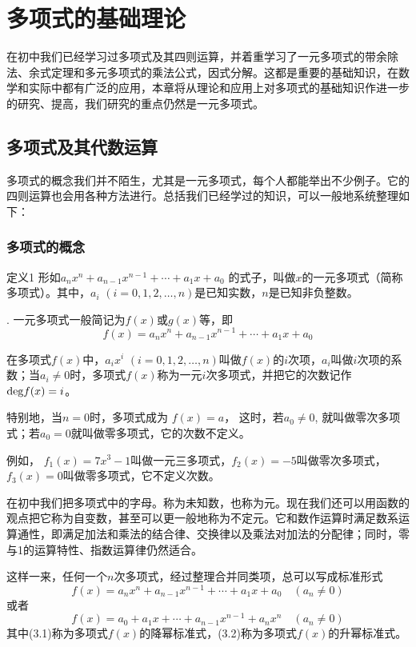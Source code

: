 \chapter{多项式的基础理论}
在初中我们已经学习过多项式及其四则运算，并着重学习了一元多项式的带余除法、余式定理和多元多项式的乘法公式，因式分解。这都是重要的基础知识，在数学和实际中都有广泛的应用，本章将从理论和应用上对多项式的基础知识作进一步的研究、提高，我们研究的重点仍然是一元多项式。

\section{多项式及其代数运算}
多项式的概念我们并不陌生，尤其是一元多项式，每个人都能举出不少例子。它的四则运算也会用各种方法进行。总括我们已经学过的知识，可以一般地系统整理如下：

\subsection{多项式的概念}
\begin{blk}{定义1}
    形如$a_nx^n+a_{n-1}x^{n-1}+\cdots+a_1x +a_0$
的式子，叫做$x$的一元多项式（简称多项式）。其中，$a_i$ $(i=0, 1, 2,\ldots,n)$是已知实数，$n$是已知非负整数。
\end{blk}
.
一元多项式一般简记为$f(x)$或$g(x)$等，即
$$f (x) =a_nx^n+a_{n-1}x^{n-1}+\cdots+a_1x +a_0$$

在多项式$f(x)$中，$a_ix^i$ $(i=0, 1, 2,\ldots,n)$叫做$f(x)$的$i$次项，$a_i$叫做$i$次项的系数；当$a_i\ne 0$时，多项式$f(x)$称为一元$i$次多项式，并把它的次数记作${\rm deg} f(x)=i$。

特别地，当$n=0$时，多项式成为
$f (x) =a$，
这时，若$a_0\ne 0$, 就叫做零次多项式；若$a_0=0$就叫做零多项式，它的次数不定义。

例如，
$f_1(x)=7x^3-1$叫做一元三多项式，$f_2(x)=-5$叫做零次多项式，$f_3(x)=0$叫做零多项式，它不定义次数。

\begin{rmk}
    在初中我们把多项式中的字母。称为未知数，也称为元。现在我们还可以用函数的观点把它称为自变数，甚至可以更一般地称为不定元。它和数作运算时满足数系运算通性，即满足加法和乘法的结合律、交换律以及乘法对加法的分配律；同时，零与1的运算特性、指数运算律仍然适合。
\end{rmk}

这样一来，任何一个$n$次多项式，经过整理合并同类项，总可以写成标准形式
\begin{equation}
f(x)=a_nx^n+a_{n-1}x^{n-1}+\cdots+a_1x +a_0\quad (a_n\ne 0)
\end{equation}
或者
\begin{equation}
    f(x)=a_0+a_1x+\cdots+a_{n-1}x^{n-1}+a_nx^n\quad (a_n\ne 0)
\end{equation}
其中(3.1)称为多项式$f(x)$的降幂标准式，(3.2)称为多项式$f(x)$的升幂标准式。


